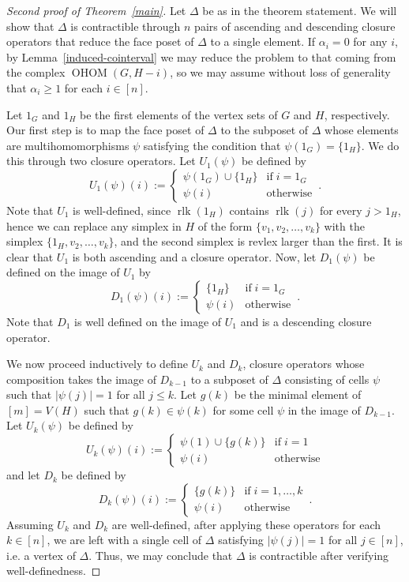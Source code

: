 \documentclass[11pt]{amsart}
\theoremstyle{definition}
\numberwithin{equation}{section}
\theoremstyle{remark}
\numberwithin{equation}{section}
\begin{document}
\begin{proof}[Second proof of Theorem~\ref{main}]

Let $\Delta$ be as in the theorem statement.  
We will show that $\Delta$ is contractible through $n$ pairs of ascending and descending closure operators that reduce the face poset of $\Delta$ to a single element.  
If $\alpha_i = 0$ for any $i$, by Lemma~\ref{induced-cointerval} we may reduce the problem to that coming from the complex $\operatorname{OHOM}(G, H - i)$, so we may assume without loss of generality that $\alpha_i \geq 1$ for each $i \in [n]$.

Let $1_G$ and $1_H$ be the first elements of the vertex sets of $G$ and $H$, respectively.
Our first step is to map the face poset of $\Delta$ to the subposet of $\Delta$ whose elements are multihomomorphisms $\psi$ satisfying the condition that $\psi(1_G) = \{1_H\}$.
We do this through two closure operators.
Let $U_1(\psi)$ be defined by 
\[U_1(\psi)(i):=\left\{ 
\begin{array}{ll}
\psi(1_G)\cup\{1_H\} & \mathrm{if} \phantom{.} i=1_G \\
\psi(i)  & \mathrm{otherwise}
\end{array}
\right.
\, . \]
Note that $U_1$ is well-defined, since $\operatorname{rlk}(1_H)$ contains $\operatorname{rlk}(j)$ for every $j>1_H$, hence we can replace any simplex in $H$ of the form $\{v_1,v_2,\ldots,v_k\}$ with the simplex $\{1_H,v_2,\ldots,v_k\}$, and the second simplex is revlex larger than the first.
It is clear that $U_1$ is both ascending and a closure operator.
Now, let $D_1(\psi)$ be defined on the image of $U_1$ by
\[D_1(\psi)(i):=\left\{ 
\begin{array}{ll}
\{1_H\} & \mathrm{if} \phantom{.} i=1_G \\
\psi(i)  & \mathrm{otherwise}
\end{array}
\right.
\, . \]
Note that $D_1$ is well defined on the image of $U_1$ and is a descending closure operator.

We now proceed inductively to define $U_k$ and $D_k$, closure operators whose composition takes the image of $D_{k-1}$ to a subposet of $\Delta$ consisting of cells $\psi$ such that $|\psi(j)|=1$ for all $j\leq k$.  
Let $g(k)$ be the minimal element of $[m]=V(H)$ such that $g(k)\in\psi(k)$ for some cell $\psi$ in the image of $D_{k-1}$.
Let $U_k(\psi)$ be defined by 
\[
U_k(\psi)(i):=\left\{ 
\begin{array}{ll}
\psi(1)\cup\{g(k)\} & \mathrm{if} \phantom{.} i=1 \\
\psi(i)  & \mathrm{otherwise}
\end{array}
\right.
\]
and let $D_k$ be defined by
\[D_k(\psi)(i):=\left\{ 
\begin{array}{ll}
\{g(k)\} & \mathrm{if} \phantom{.} i=1,\ldots,k \\
\psi(i)  & \mathrm{otherwise}
\end{array}
\right.
\, . \]
Assuming $U_k$ and $D_k$ are well-defined, after applying these operators for each $k\in [n]$, we are left with a single cell of $\Delta$ satisfying $|\psi(j)|=1$ for all $j\in [n]$, i.e. a vertex of $\Delta$.  
Thus, we may conclude that $\Delta$ is contractible after verifying well-definedness.


\end{proof}
\end{document}
